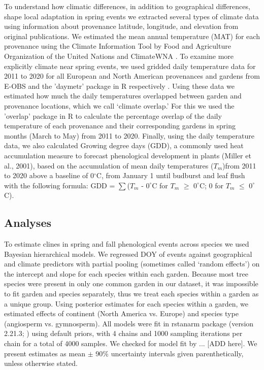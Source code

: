 \documentclass{article}
\begin{document}
\newline
To understand how climatic differences, in addition to geographical differences, shape local adaptation in spring events we extracted several types of climate data using information about provenance latitude, longitude, and elevation from original publications. We estimated the mean annual temperature (MAT) for each provenance using the Climate Information Tool by Food and Agriculture Organization of the United Nations \citep{FAO2022}and ClimateWNA \citep{wang2016}. To examine more explicitly climate near spring events, we used gridded daily temperature data for 2011 to 2020 for all European and North American provenances and gardens from E-OBS and the 'daymetr' package in R respectively \citep{cornes2018,hufkens2018}. Using these data we estimated how much the daily temperatures overlapped between garden and provenance locations, which we call `climate overlap.' For this we used the 'overlap' package in R to calculate the percentage overlap of the daily temperature of each provenance and their corresponding gardens in spring months (March to May) from 2011 to 2020. Finally, using the daily temperature data, we also calculated Growing degree days (GDD), a commonly used heat accumulation measure to forecast phenological development in plants (Miller et al., 2001), based on the accumulation of mean daily temperatures ($T_{m}$)from 2011 to 2020 above a baseline of 0$^{\circ}$C, from January 1 until budburst and leaf flush with the following formula: GDD = $\sum$($T_{m}$ - $0^{\circ}$C for $T_{m}$ $\ge$ $0^{\circ}$C; 0 for $T_{m}$ $\le$ $0^{\circ}$C).

\subsection{Analyses}
To estimate clines in spring and fall phenological events across species we used Bayesian hierarchical models. We regressed DOY of events against geographical and climate predictors with partial pooling (sometimes called `random effects') on the intercept and slope for each species within each garden. Because most tree species were present in only one common garden in our dataset, it was impossible to fit garden and species separately, thus we treat each species within a garden as a unique group. Using posterior estimates for each species within a garden, we estimated effects of continent (North America vs. Europe) and species type (angiosperm vs. gymnosperm). All models were fit in rstanarm package (version 2.21.3; \citealp{brilleman2018}) using default priors, with 4 chains and 1000 sampling iterations per chain for a total of 4000 samples. We checked for model fit by ... [ADD here]. We present estimates as mean $\pm$ 90\% uncertainty intervals given parenthetically, unless otherwise stated. 
\end{document}
